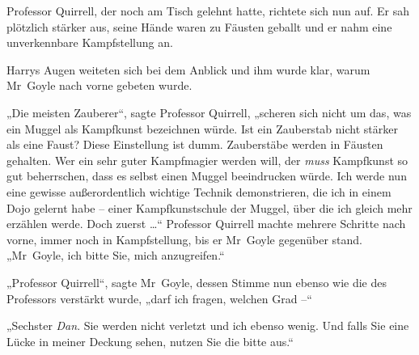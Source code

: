 Professor Quirrell, der noch am Tisch gelehnt hatte, richtete sich nun auf. Er sah plötzlich stärker aus, seine Hände waren zu Fäusten geballt und er nahm eine unverkennbare Kampfstellung an.

Harrys Augen weiteten sich bei dem Anblick und ihm wurde klar, warum Mr~Goyle nach vorne gebeten wurde.

„Die meisten Zauberer“, sagte Professor Quirrell, „scheren sich nicht um das, was ein Muggel als Kampfkunst bezeichnen würde. Ist ein Zauberstab nicht stärker als eine Faust? Diese Einstellung ist dumm. Zauberstäbe werden in Fäusten gehalten. Wer ein sehr guter Kampfmagier werden will, der \emph{muss} Kampfkunst so gut beherrschen, dass es selbst einen Muggel beeindrucken würde. Ich werde nun eine gewisse außerordentlich wichtige Technik demonstrieren, die ich in einem Dojo gelernt habe – einer Kampfkunstschule der Muggel, über die ich gleich mehr erzählen werde. Doch zuerst …“ Professor Quirrell machte mehrere Schritte nach vorne, immer noch in Kampfstellung, bis er Mr~Goyle gegenüber stand. „Mr~Goyle, ich bitte Sie, mich anzugreifen.“

„Professor Quirrell“, sagte Mr~Goyle, dessen Stimme nun ebenso wie die des Professors verstärkt wurde, „darf ich fragen, welchen Grad –“

„Sechster \emph{Dan}. Sie werden nicht verletzt und ich ebenso wenig. Und falls Sie eine Lücke in meiner Deckung sehen, nutzen Sie die bitte aus.“

